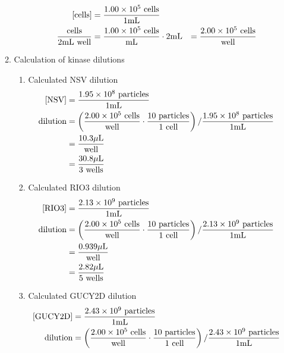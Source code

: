 \begin{enumerate}
\begin{enumerate}
\begin{enumerate}
					\begin{align*}
					\text{[cells]} &= \frac{1.00\times 10^{5}\text{ cells}}{1\text{mL}} \\
					\frac{\text{cells}}{2\text{mL well}} &= \frac{1.00\times 10^{5}\text{ cells}}{\text{mL}} \cdot 2\text{mL} &= \frac{2.00\times 10^{5}\text{ cells}}{\text{well}}\\
					\end{align*}
				\end{enumerate}
			\item Calculation of kinase dilutions
				\begin{enumerate}
				\item Calculated NSV dilution
						\begin{align*}
							\text{[NSV]} &= \frac{1.95\times 10^{8}\text{ particles}}{1\text{mL}}\\
							\text{dilution}&= \left(\frac{2.00\times 10^{5}\text{ cells}}{\text{well}}\cdot \frac{10\text{ particles}}{1\text{ cell}}\right)/\frac{1.95\times 10^{8}\text{ particles}}{1\text{mL}}\\
							&= \frac{10.3\mu\text{L}}{\text{well}}\\
							&= \frac{30.8\mu\text{L}}{3\text{ wells}}
						\end{align*}
					\item Calculated RIO3 dilution
						\begin{align*}
							\text{[RIO3]} &= \frac{2.13\times 10^{9}\text{ particles}}{1\text{mL}}\\
							\text{dilution}&= \left(\frac{2.00\times 10^{5}\text{ cells}}{\text{well}}\cdot \frac{10\text{ particles}}{1\text{ cell}}\right)/\frac{2.13\times 10^{9}\text{ particles}}{1\text{mL}}\\
							&= \frac{0.939\mu\text{L}}{\text{well}}\\
							&= \frac{2.82\mu\text{L}}{5\text{ wells}}
						\end{align*}
					\item Calculated GUCY2D dilution
						\begin{align*}
							\text{[GUCY2D]} &= \frac{2.43\e{9}\text{ particles}}{1\text{mL}}\\
							\text{dilution}&= \left(\frac{2.00\e{5}\text{ cells}}{\text{well}}\cdot \frac{10\text{ particles}}{1\text{ cell}}\right)/\frac{2.43\e{9}\text{ particles}}{1\text{mL}}\\

\end{align*}
\end{enumerate}
\end{enumerate}
\end{enumerate}
